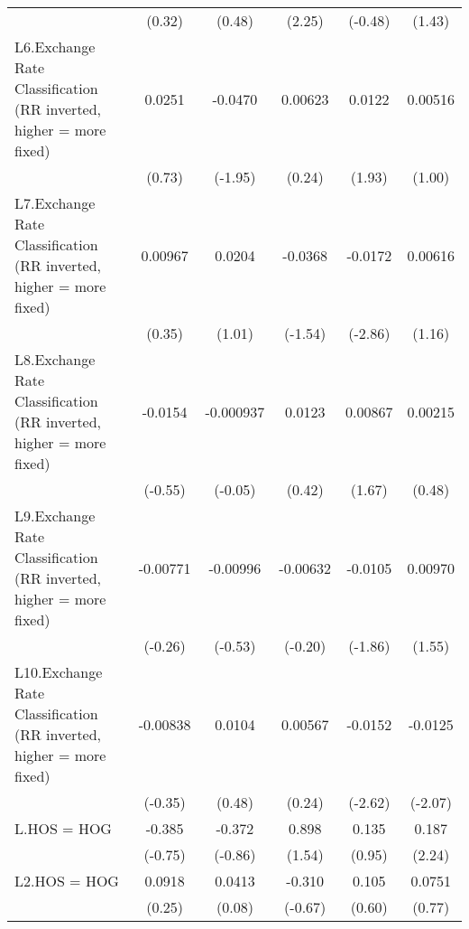 {\begin{longtable}{l*{5}{c}}
                &   (0.32)         &   (0.48)         &   (2.25)         &  (-0.48)         &   (1.43)         \\
\addlinespace
L6.Exchange Rate Classification (RR inverted, higher = more fixed)&   0.0251         &  -0.0470         &  0.00623         &   0.0122         &  0.00516         \\
                &   (0.73)         &  (-1.95)         &   (0.24)         &   (1.93)         &   (1.00)         \\
\addlinespace
L7.Exchange Rate Classification (RR inverted, higher = more fixed)&  0.00967         &   0.0204         &  -0.0368         &  -0.0172\sym{**} &  0.00616         \\
                &   (0.35)         &   (1.01)         &  (-1.54)         &  (-2.86)         &   (1.16)         \\
\addlinespace
L8.Exchange Rate Classification (RR inverted, higher = more fixed)&  -0.0154         &-0.000937         &   0.0123         &  0.00867         &  0.00215         \\
                &  (-0.55)         &  (-0.05)         &   (0.42)         &   (1.67)         &   (0.48)         \\
\addlinespace
L9.Exchange Rate Classification (RR inverted, higher = more fixed)& -0.00771         & -0.00996         & -0.00632         &  -0.0105         &  0.00970         \\
                &  (-0.26)         &  (-0.53)         &  (-0.20)         &  (-1.86)         &   (1.55)         \\
\addlinespace
L10.Exchange Rate Classification (RR inverted, higher = more fixed)& -0.00838         &   0.0104         &  0.00567         &  -0.0152\sym{**} &  -0.0125\sym{*}  \\
                &  (-0.35)         &   (0.48)         &   (0.24)         &  (-2.62)         &  (-2.07)         \\
\addlinespace
L.HOS = HOG     &   -0.385         &   -0.372         &    0.898         &    0.135         &    0.187\sym{*}  \\
                &  (-0.75)         &  (-0.86)         &   (1.54)         &   (0.95)         &   (2.24)         \\
\addlinespace
L2.HOS = HOG    &   0.0918         &   0.0413         &   -0.310         &    0.105         &   0.0751         \\
                &   (0.25)         &   (0.08)         &  (-0.67)         &   (0.60)         &   (0.77)         \\

\end{longtable}}

